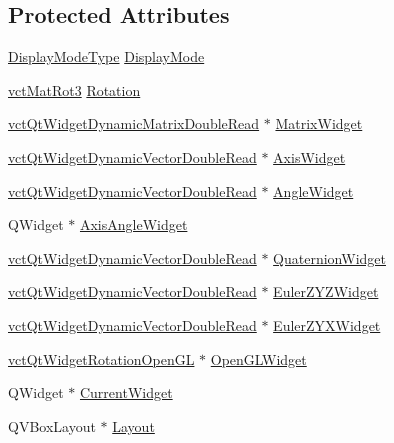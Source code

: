\subsection*{Protected Attributes}
\begin{DoxyCompactItemize}
\item 
\hyperlink{classvct_qt_widget_rotation_double_read_a77ae5a0ee5fe231ad2f9dd020aad434c}{Display\-Mode\-Type} \hyperlink{classvct_qt_widget_rotation_double_read_a94210cdbcdb5bc33b8f5650c11602fba}{Display\-Mode}
\item 
\hyperlink{vct_transformation_types_8h_a30fe23c1d38748a9b8f2fb9bb2471382}{vct\-Mat\-Rot3} \hyperlink{classvct_qt_widget_rotation_double_read_ab356235edf17d23d15ce8289b4ad91c9}{Rotation}
\item 
\hyperlink{classvct_qt_widget_dynamic_matrix_double_read}{vct\-Qt\-Widget\-Dynamic\-Matrix\-Double\-Read} $\ast$ \hyperlink{classvct_qt_widget_rotation_double_read_adc00f353c77e8bdacea999862525a98c}{Matrix\-Widget}
\item 
\hyperlink{vct_qt_forward_declarations_8h_a6cbce1b6d338096215fc40cb0fdfb848}{vct\-Qt\-Widget\-Dynamic\-Vector\-Double\-Read} $\ast$ \hyperlink{classvct_qt_widget_rotation_double_read_a9ee41a77e34de07df6f5ff07d84a5475}{Axis\-Widget}
\item 
\hyperlink{vct_qt_forward_declarations_8h_a6cbce1b6d338096215fc40cb0fdfb848}{vct\-Qt\-Widget\-Dynamic\-Vector\-Double\-Read} $\ast$ \hyperlink{classvct_qt_widget_rotation_double_read_abb6e58717cd7c8fb1f7009d13c0620f6}{Angle\-Widget}
\item 
Q\-Widget $\ast$ \hyperlink{classvct_qt_widget_rotation_double_read_a3844f6a9444da39ef3128c92ee0df21d}{Axis\-Angle\-Widget}
\item 
\hyperlink{vct_qt_forward_declarations_8h_a6cbce1b6d338096215fc40cb0fdfb848}{vct\-Qt\-Widget\-Dynamic\-Vector\-Double\-Read} $\ast$ \hyperlink{classvct_qt_widget_rotation_double_read_ac469ac805f4ad832983f39cb6768da6b}{Quaternion\-Widget}
\item 
\hyperlink{vct_qt_forward_declarations_8h_a6cbce1b6d338096215fc40cb0fdfb848}{vct\-Qt\-Widget\-Dynamic\-Vector\-Double\-Read} $\ast$ \hyperlink{classvct_qt_widget_rotation_double_read_afa391035ce844d15576568341fe76ff2}{Euler\-Z\-Y\-Z\-Widget}
\item 
\hyperlink{vct_qt_forward_declarations_8h_a6cbce1b6d338096215fc40cb0fdfb848}{vct\-Qt\-Widget\-Dynamic\-Vector\-Double\-Read} $\ast$ \hyperlink{classvct_qt_widget_rotation_double_read_a7c7bd62052f17e43c02e33c716ba25cf}{Euler\-Z\-Y\-X\-Widget}
\item 
\hyperlink{classvct_qt_widget_rotation_open_g_l}{vct\-Qt\-Widget\-Rotation\-Open\-G\-L} $\ast$ \hyperlink{classvct_qt_widget_rotation_double_read_a98528053032a5996bb4f13f0d6b09fd6}{Open\-G\-L\-Widget}
\item 
Q\-Widget $\ast$ \hyperlink{classvct_qt_widget_rotation_double_read_aaf10f5198b34b0bcdbb7a9ba6838862c}{Current\-Widget}
\item 
Q\-V\-Box\-Layout $\ast$ \hyperlink{classvct_qt_widget_rotation_double_read_adfea7d24e7293efe2734d0adfccb32e5}{Layout}
\end{DoxyCompactItemize}


